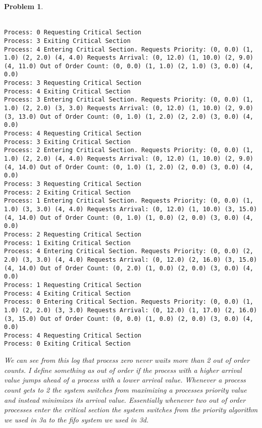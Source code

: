 \documentclass{article}
\theoremstyle{problemstyle}
\newtheorem{problem}{Problem}
\begin{document}
\begin{problem}~\\\\
	\begin{lstlisting}[breaklines]
Process: 0 Requesting Critical Section
Process: 3 Exiting Critical Section
Process: 4 Entering Critical Section. Requests Priority: (0, 0.0) (1, 1.0) (2, 2.0) (4, 4.0) Requests Arrival: (0, 12.0) (1, 10.0) (2, 9.0) (4, 11.0) Out of Order Count: (0, 0.0) (1, 1.0) (2, 1.0) (3, 0.0) (4, 0.0)
Process: 3 Requesting Critical Section
Process: 4 Exiting Critical Section
Process: 3 Entering Critical Section. Requests Priority: (0, 0.0) (1, 1.0) (2, 2.0) (3, 3.0) Requests Arrival: (0, 12.0) (1, 10.0) (2, 9.0) (3, 13.0) Out of Order Count: (0, 1.0) (1, 2.0) (2, 2.0) (3, 0.0) (4, 0.0)
Process: 4 Requesting Critical Section
Process: 3 Exiting Critical Section
Process: 2 Entering Critical Section. Requests Priority: (0, 0.0) (1, 1.0) (2, 2.0) (4, 4.0) Requests Arrival: (0, 12.0) (1, 10.0) (2, 9.0) (4, 14.0) Out of Order Count: (0, 1.0) (1, 2.0) (2, 0.0) (3, 0.0) (4, 0.0)
Process: 3 Requesting Critical Section
Process: 2 Exiting Critical Section
Process: 1 Entering Critical Section. Requests Priority: (0, 0.0) (1, 1.0) (3, 3.0) (4, 4.0) Requests Arrival: (0, 12.0) (1, 10.0) (3, 15.0) (4, 14.0) Out of Order Count: (0, 1.0) (1, 0.0) (2, 0.0) (3, 0.0) (4, 0.0)
Process: 2 Requesting Critical Section
Process: 1 Exiting Critical Section
Process: 4 Entering Critical Section. Requests Priority: (0, 0.0) (2, 2.0) (3, 3.0) (4, 4.0) Requests Arrival: (0, 12.0) (2, 16.0) (3, 15.0) (4, 14.0) Out of Order Count: (0, 2.0) (1, 0.0) (2, 0.0) (3, 0.0) (4, 0.0)
Process: 1 Requesting Critical Section
Process: 4 Exiting Critical Section
Process: 0 Entering Critical Section. Requests Priority: (0, 0.0) (1, 1.0) (2, 2.0) (3, 3.0) Requests Arrival: (0, 12.0) (1, 17.0) (2, 16.0) (3, 15.0) Out of Order Count: (0, 0.0) (1, 0.0) (2, 0.0) (3, 0.0) (4, 0.0)
Process: 4 Requesting Critical Section
Process: 0 Exiting Critical Section
\end{lstlisting}
		
We can see from this log that process zero never waits more than 2 out of order counts. I define something as out of order if the process with a higher arrival value jumps ahead of a process with a lower arrival value. Whenever a process count gets to 2 the system switches from maximizing a processes priority value and instead minimizes its arrival value. Essentially whenever two out of order processes enter the critical section the system switches from the priority algorithm we used in 3a to the fifo system we used in 3d.

\end{problem}
\end{document}
